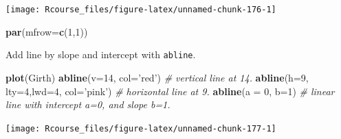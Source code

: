 \documentclass[]{book}
\newenvironment{Shaded}{\begin{snugshade}}{\end{snugshade}}
\newcommand{\KeywordTok}[1]{\textcolor[rgb]{0.13,0.29,0.53}{\textbf{{#1}}}}
\newcommand{\DataTypeTok}[1]{\textcolor[rgb]{0.13,0.29,0.53}{{#1}}}
\newcommand{\DecValTok}[1]{\textcolor[rgb]{0.00,0.00,0.81}{{#1}}}
\newcommand{\StringTok}[1]{\textcolor[rgb]{0.31,0.60,0.02}{{#1}}}
\newcommand{\CommentTok}[1]{\textcolor[rgb]{0.56,0.35,0.01}{\textit{{#1}}}}
\newcommand{\NormalTok}[1]{{#1}}
\theoremstyle{definition}
\theoremstyle{definition}
\theoremstyle{remark}
\begin{document}
\texttt{[image: Rcourse\_files/figure-latex/unnamed-chunk-176-1]}

\begin{Shaded}
\begin{Highlighting}[]
\KeywordTok{par}\NormalTok{(}\DataTypeTok{mfrow=}\KeywordTok{c}\NormalTok{(}\DecValTok{1}\NormalTok{,}\DecValTok{1}\NormalTok{))}
\end{Highlighting}
\end{Shaded}

Add line by slope and intercept with \texttt{abline}.

\begin{Shaded}
\begin{Highlighting}[]
\KeywordTok{plot}\NormalTok{(Girth)}
\KeywordTok{abline}\NormalTok{(}\DataTypeTok{v=}\DecValTok{14}\NormalTok{, }\DataTypeTok{col=}\StringTok{'red'}\NormalTok{) }\CommentTok{# vertical line at 14.}
\KeywordTok{abline}\NormalTok{(}\DataTypeTok{h=}\DecValTok{9}\NormalTok{, }\DataTypeTok{lty=}\DecValTok{4}\NormalTok{,}\DataTypeTok{lwd=}\DecValTok{4}\NormalTok{, }\DataTypeTok{col=}\StringTok{'pink'}\NormalTok{) }\CommentTok{# horizontal line at 9.}
\KeywordTok{abline}\NormalTok{(}\DataTypeTok{a =} \DecValTok{0}\NormalTok{, }\DataTypeTok{b=}\DecValTok{1}\NormalTok{) }\CommentTok{# linear line with intercept a=0, and slope b=1.}
\end{Highlighting}
\end{Shaded}

\texttt{[image: Rcourse\_files/figure-latex/unnamed-chunk-177-1]}
\end{document}
